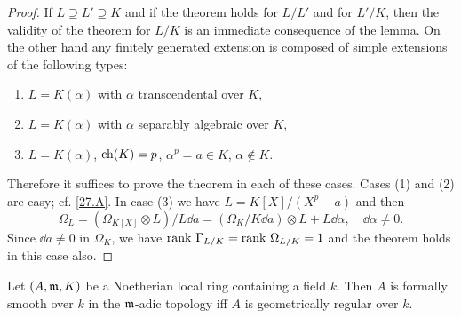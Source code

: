 \documentclass[../main]{subfiles}
\begin{document}
\begin{proof}
If $L \supseteq L' \supseteq K$ and if the theorem holds for $L/L'$ and for $L'/K$, then the validity of the theorem for $L/K$ is an immediate consequence of the lemma. On the other hand any finitely generated extension is composed of simple extensions of the following types: 
\begin{enumerate}[label = (\arabic*)]
    \item $L = K(\alpha)$ with $\alpha$ transcendental over $K$,
    \item $L = K(\alpha)$ with $\alpha$ separably algebraic over $K$,
    \item $L = K(\alpha)$, $\operatorname{ch}(K) = p$, $\alpha^p = a \in K$, $\alpha \not \in K$.
\end{enumerate}
Therefore it suffices to prove the theorem in each of these cases. Cases (1) and (2) are easy; cf. \ref{27.A}. In case (3) we have $L = K[X]/(X^p - a)$ and then \[\Omega_L = (\Omega_{K[X]} \otimes L)/L \dd a = (\Omega_K/K \dd a) \otimes L + L \dd \alpha,\quad \dd \alpha \ne 0.\] Since $\dd a \ne 0$ in $\Omega_K$, we have $\operatorname{rank} \, \Gamma_{L/K} = \operatorname{rank} \, \Omega_{L/K} = 1$ and the theorem holds in this case also.
\end{proof}

\begin{partheorem}\label{thm:093}
Let $(A, \mathfrak{m}, K)$ be a Noetherian local ring containing a field $k$. Then $A$ is formally smooth over $k$ in the $\mathfrak{m}$-adic topology iff $A$ is geometrically regular over $k$. 
\end{partheorem}
\end{document}
